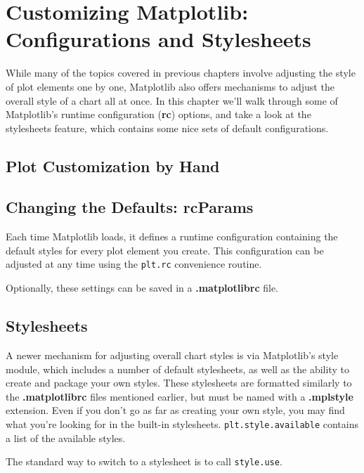 \chapter{Customizing Matplotlib: Configurations and Stylesheets\label{Ch34}}
While many of the topics covered in previous chapters involve adjusting the style of
plot elements one by one, Matplotlib also offers mechanisms to adjust the overall
style of a chart all at once. In this chapter we'll walk through some of Matplotlib's runtime configuration (\textbf{rc}) options, and take a look at the stylesheets feature, which
contains some nice sets of default configurations.

\section{Plot Customization by Hand}

\section{Changing the Defaults: rcParams}
Each time Matplotlib loads, it defines a runtime configuration containing the default
styles for every plot element you create. This configuration can be adjusted at any
time using the \verb|plt.rc| convenience routine.

Optionally, these settings can be saved in a \textbf{.matplotlibrc} file.

\section{Stylesheets}
A newer mechanism for adjusting overall chart styles is via Matplotlib's style module, which includes a number of default stylesheets, as well as the ability to create and
package your own styles. These stylesheets are formatted similarly to the \textbf{.matplotlibrc}
files mentioned earlier, but must be named with a \textbf{.mplstyle} extension.
Even if you don't go as far as creating your own style, you may find what you're looking for in the built-in stylesheets. \verb|plt.style.available| contains a list of the available styles.

The standard way to switch to a stylesheet is to call \verb|style.use|.


